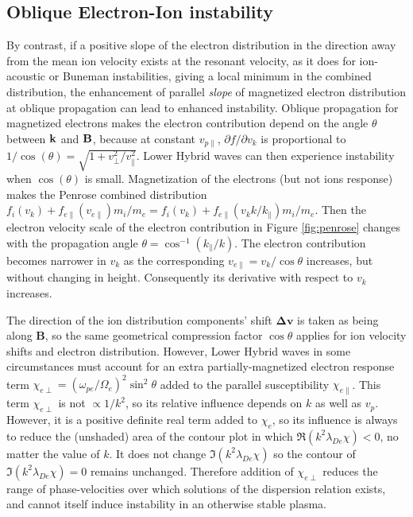 \documentclass[12pt]{article}
\begin{document}
\subsection{Oblique Electron-Ion instability}

By contrast, if a positive slope of the electron distribution in the
direction away from the mean ion velocity exists at the resonant
velocity, as it does for ion-acoustic or Buneman instabilities, giving
a local minimum in the combined distribution, the enhancement of
parallel \emph{slope} of magnetized electron distribution at oblique
propagation can lead to enhanced instability.  Oblique propagation for
magnetized electrons makes the electron contribution depend on the
angle $\theta$ between ${\bf k}$ and ${\bf B}$, because at constant
$v_{p\parallel}$, $\partial f /\partial v_k$ is proportional to
$1/\cos(\theta)=\sqrt{1+v_\perp^2/v_\parallel^2}$. Lower Hybrid waves
can then experience instability when $\cos(\theta)$ is small.
Magnetization of the electrons (but not ions response) makes the Penrose
combined distribution
$f_i(v_k)+f_{e\parallel}(v_{e\parallel})m_i/m_e=f_i(v_k)+f_{e\parallel}(v_kk/k_\parallel)m_i/m_e$. Then
the electron velocity scale of the electron contribution in Figure
\ref{fig:penrose} changes with the propagation angle
$\theta=\cos^{-1}(k_\parallel/k)$. The electron contribution becomes
narrower in $v_k$ as the corresponding $v_{e\parallel}=v_k/\cos\theta$
increases, but without changing in height. Consequently its derivative
with respect to $v_k$ increases.

The direction of the ion distribution components' shift
$\bm\Delta\bm v$ is taken as being along $\bm B$, so the same
geometrical compression factor $\cos\theta$ applies for ion velocity
shifts and electron distribution. However, Lower Hybrid waves in some
circumstances must account for an extra partially-magnetized electron
response term $\chi_{e\perp}=(\omega_{pe}/\Omega_e)^2\sin^2\theta$
added to the parallel susceptibility
$\chi_{e\parallel}$. This term $\chi_{e\perp}$ is not $\propto 1/k^2$,
so its relative influence depends on $k$ as well as $v_p$. However,
it is a positive definite real term added to $\chi_e$, so its
influence is always to reduce the (unshaded) area of the contour plot
in which $\Re(k^2\lambda_{De}\chi)<0$, no matter the value of $k$. It
does not change $\Im(k^2\lambda_{De}\chi)$ so the contour of
$\Im(k^2\lambda_{De}\chi)=0$ remains unchanged. Therefore addition of
$\chi_{e\perp}$ reduces the range of phase-velocities over which
solutions of the dispersion relation exists, and cannot itself induce
instability in an otherwise stable plasma.
\end{document}
